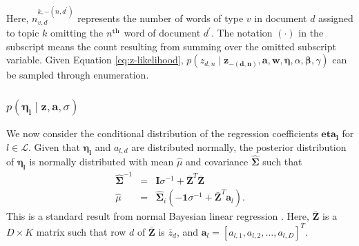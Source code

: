 \documentclass{article}
\begin{document}
%
Here, $n_{v,d}^{k,-\left(n, d^{\prime} \right)}$ represents the number of words of type $v$ in document $d$ assigned to topic $k$ omitting the $n^{\rm th}$ word of document $d^{\prime}$.  The notation $(\cdot)$ in the subscript means the count resulting from summing over the omitted subscript variable.  Given Equation \ref{eq:z-likelihood}, $p\left(z_{d,n}\mid\mathbf{z_{-\left(d,n\right)}},\mathbf{a},\mathbf{w},\mathbf{\eta},\alpha,\mathbf{\beta},\gamma\right)$ can be sampled through enumeration.
%
\subsubsection{$p\left(\mathbf{\eta_l}\mid\mathbf{z},\mathbf{a},\sigma\right)$}
%
We now consider the conditional distribution of the regression coefficients $\mathbf{eta_l}$ for $l \in \mathcal{L}$.  Given that $\mathbf{\eta_l}$ and $a_{l,d}$ are distributed normally, the posterior distribution of $\mathbf{\eta_l}$ is normally distributed with mean $\hat \mu$ and covariance $\hat{\mathbf{\Sigma}}$ such that
\begin{eqnarray}
\hat{\mathbf{\Sigma}}^{-1} &=&\mathbf{I}\sigma^{-1}+\bar{\mathbf{Z}}^{T}\bar{\mathbf{Z}} \\
\hat \mu &=&\hat{\mathbf{\Sigma}}_{i}\left(-\mathbf{1}\sigma^{-1}+\bar{\mathbf{Z}}^{T}\mathbf{a}_l\right). 
\end{eqnarray}
This is a standard result from normal Bayesian linear regression \citep{BishopPRML}.  Here, $\bar{\mathbf{Z}}$ is a $D \times K$ matrix such that row $d$ of $\mathbf{\bar Z}$ is $\bar z_d$, and $\mathbf{a}_l = [a_{l,1}, a_{l,2}, \ldots, a_{l,D}]^T$.
%
%
%
%
%
%
%
\end{document}
